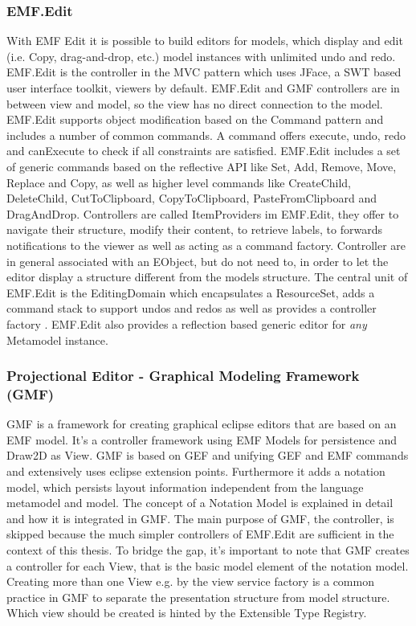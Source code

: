 \subsubsection{EMF.Edit}
With EMF Edit it is possible to build editors for models, which display and edit (i.e. Copy, drag-and-drop, etc.) model instances with unlimited undo and redo. EMF.Edit is the controller in the MVC pattern which uses JFace, a SWT based user interface toolkit, viewers by default. EMF.Edit and GMF controllers are in between view and model, so the view has no direct connection to the model. EMF.Edit supports object modification based on the Command pattern \cite{patterns} and includes a number of common commands. A command offers execute, undo, redo and canExecute to check if all constraints are satisfied.  EMF.Edit includes a set of generic commands based on the reflective API like Set, Add, Remove, Move, Replace and Copy, as well as  higher level commands like CreateChild, DeleteChild, CutToClipboard, CopyToClipboard, PasteFromClipboard and DragAndDrop. Controllers are called ItemProviders im EMF.Edit, they offer to navigate their structure, modify their content, to retrieve labels, to forwards notifications to the viewer as well as acting as a command factory. Controller are in general associated with an EObject, but do not need to, in order to let the editor display a structure different from the models structure. The central unit of EMF.Edit is the EditingDomain which encapsulates a ResourceSet, adds a command stack to support undos and redos as well as provides a controller factory \cite{EMF2nd}. EMF.Edit also provides a reflection based generic editor for \emph{any} Metamodel instance.  


\subsubsection {Projectional Editor - Graphical Modeling Framework (GMF)}
GMF is a framework for creating graphical eclipse editors that are based on an EMF model. It's a controller framework using EMF Models for persistence and Draw2D as View. GMF is based on GEF  and unifying GEF and EMF commands and extensively uses eclipse extension points. Furthermore it adds a notation model, which persists layout information independent from the language metamodel and model. The concept of a Notation Model is explained in detail  and how it is integrated in GMF. The main purpose of GMF, the controller, is skipped because the much simpler controllers of EMF.Edit are sufficient in the context of this thesis. To bridge the gap, it's important to note that GMF creates a controller for each View, that is the basic model element of the notation model. Creating more than one View e.g. by the view service factory is a common practice in GMF to separate the presentation structure from model structure. Which view should be created is hinted by the Extensible Type Registry.

